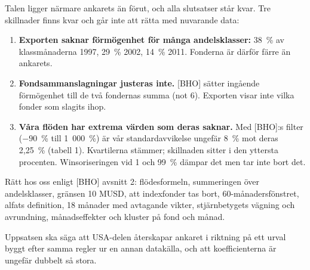 \documentclass[10pt,a4paper]{article}
\begin{document}
Talen ligger närmare ankarets än förut, och alla slutsatser står kvar. Tre skillnader finns kvar och går inte att rätta med nuvarande data:
\begin{enumerate}[leftmargin=*,itemsep=1pt]
\item \textbf{Exporten saknar förmögenhet för många andelsklasser:} 38~\% av klassmånaderna 1997, 29~\% 2002, 14~\% 2011. Fonderna är därför färre än ankarets.
\item \textbf{Fondsammanslagningar justeras inte.} [BHO] sätter ingående förmögenhet till de två fondernas summa (not 6). Exporten visar inte vilka fonder som slagits ihop.
\item \textbf{Våra flöden har extrema värden som deras saknar.} Med [BHO]:s filter ($-90$~\% till 1~000~\%) är vår standardavvikelse ungefär 8~\% mot deras 2,25~\% (tabell 1). Kvartilerna stämmer; skillnaden sitter i den yttersta procenten. Winsoriseringen vid 1 och 99~\% dämpar det men tar inte bort det.
\end{enumerate}
Rätt hos oss enligt [BHO] avsnitt 2: flödesformeln, summeringen över andelsklasser, gränsen 10 MUSD, att indexfonder tas bort, 60-månadersfönstret, alfats definition, 18 månader med avtagande vikter, stjärnbetygets vägning och avrundning, månadseffekter och kluster på fond och månad.

Uppsatsen ska säga att USA-delen återskapar ankaret i riktning på ett urval byggt efter samma regler ur en annan datakälla, och att koefficienterna är ungefär dubbelt så stora.
\end{document}
